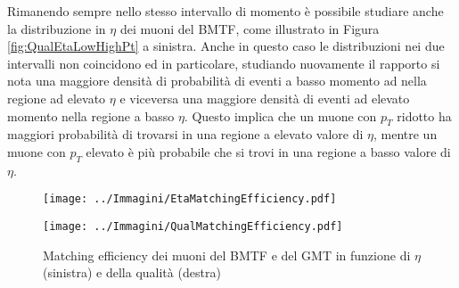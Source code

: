 Rimanendo sempre nello stesso intervallo di momento è possibile studiare anche la distribuzione in $\eta$ dei muoni del BMTF, come illustrato in Figura \ref{fig:QualEtaLowHighPt} a sinistra. Anche in questo caso le distribuzioni nei due intervalli non coincidono ed in particolare, studiando nuovamente il rapporto si nota una maggiore densità di probabilità di eventi a basso momento ad nella regione ad elevato $\eta$ e viceversa una maggiore densità di eventi ad elevato momento nella regione a basso $\eta$. \newline
Questo implica che un muone con $p_T$ ridotto ha maggiori probabilità di trovarsi in una regione a elevato valore di $\eta$, mentre un muone con $p_T$ elevato è più probabile che si trovi in una regione a basso valore di $\eta$.

\begin{figure}[t]
  \centering
  \begin{minipage}[b]{0.49\textwidth}
    \centering
    \texttt{[image: ../Immagini/EtaMatchingEfficiency.pdf]} 
    \end{minipage}
    \hfill 
    \begin{minipage}[b]{0.49\textwidth}
      \centering
      \texttt{[image: ../Immagini/QualMatchingEfficiency.pdf]}
    \end{minipage}
    \caption{Matching efficiency dei muoni del BMTF e del GMT in funzione di $\eta$ (sinistra) e della qualità (destra)}
  \label{fig:MatchingEfficiecyPt3}
\end{figure}


